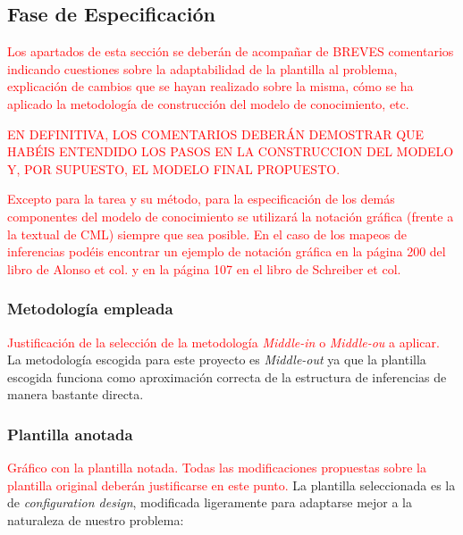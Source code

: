 \documentclass[12pt,a4paper,twoside,spanish]{article}      %
\begin{document}
\subsection{Fase de Especificación}

\textcolor {red} {Los apartados de esta sección  se deberán de acompañar de BREVES comentarios indicando cuestiones sobre la adaptabilidad de la plantilla al problema, explicación de cambios que se hayan realizado sobre la misma, cómo se ha aplicado la metodología de construcción del modelo de conocimiento, etc.}

\textcolor {red} {EN DEFINITIVA, LOS COMENTARIOS DEBERÁN DEMOSTRAR QUE HABÉIS ENTENDIDO LOS PASOS EN LA CONSTRUCCION DEL MODELO Y, POR SUPUESTO, EL MODELO FINAL PROPUESTO.}

\textcolor {red} {Excepto para la tarea y su método, para la especificación de los demás componentes del modelo de conocimiento se utilizará la notación gráfica (frente a la textual de CML) siempre que sea posible. En el caso de los mapeos de inferencias podéis encontrar un ejemplo de notación gráfica en la página 200 del libro de Alonso et col. y en la página 107 en el libro de Schreiber et col.}


\subsubsection{Metodología empleada}
\textcolor {red} {Justificación de la selección de la metodología \emph{Middle-in} o \emph{Middle-ou} a aplicar.}
La metodología escogida para este proyecto es \textit{Middle-out} ya que la plantilla escogida funciona como aproximación correcta de la estructura de inferencias de manera bastante directa.


\subsubsection{Plantilla anotada}

\textcolor {red} {Gráfico con la plantilla notada. Todas las modificaciones propuestas sobre la plantilla original deberán justificarse en este punto.}
La plantilla seleccionada es la de \textit{configuration design}, modificada ligeramente para adaptarse mejor a la naturaleza de nuestro problema:
\end{document}
